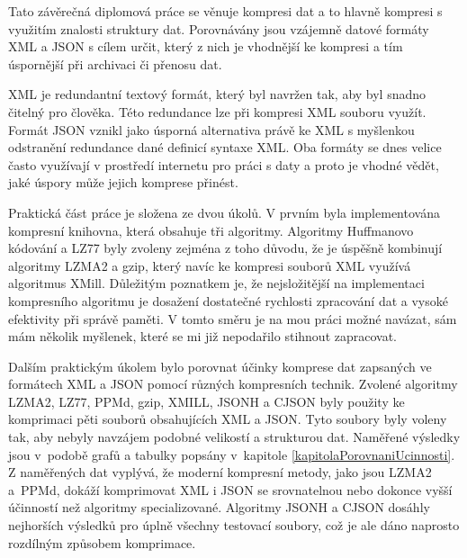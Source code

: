 

Tato závěrečná diplomová práce se věnuje kompresi dat a to hlavně kompresi s využitím znalosti struktury dat. Porovnávány jsou vzájemně datové formáty XML a JSON s cílem určit, který z nich je vhodnější ke kompresi a tím úspornější při archivaci či přenosu dat.

XML je redundantní textový formát, který byl navržen tak, aby byl snadno čitelný pro člověka. Této redundance lze při kompresi XML souboru využít. Formát JSON vznikl jako úsporná alternativa právě ke XML s myšlenkou odstranění redundance dané definicí syntaxe XML. Oba formáty se dnes velice často využívají v prostředí internetu pro práci s daty a proto je vhodné vědět, jaké úspory může jejich komprese přinést.

Praktická část práce je složena ze dvou úkolů. V prvním byla implementována kompresní knihovna, která obsahuje tři algoritmy. Algoritmy Huffmanovo kódování a LZ77 byly zvoleny zejména z toho důvodu, že je úspěšně kombinují algoritmy LZMA2 a gzip, který navíc ke kompresi souborů XML využívá algoritmus XMill. Důležitým poznatkem je, že nejsložitější na implementaci kompresního algoritmu je dosažení dostatečné rychlosti zpracování dat a vysoké efektivity při správě paměti. V tomto směru je na mou práci možné navázat, sám mám několik myšlenek, které se mi již nepodařilo stihnout zapracovat.

Dalším praktickým úkolem bylo porovnat účinky komprese dat zapsaných ve formátech XML a JSON pomocí různých kompresních technik. Zvolené algoritmy LZMA2, LZ77, PPMd, gzip, XMILL, JSONH a CJSON byly použity ke komprimaci pěti souborů obsahujících XML a JSON. Tyto soubory byly voleny tak, aby nebyly navzájem podobné velikostí a strukturou dat. Naměřené výsledky jsou v~podobě grafů a tabulky popsány v~kapitole \ref{kapitolaPorovnaniUcinnosti}. Z naměřených dat vyplývá, že moderní kompresní metody, jako jsou LZMA2 a~PPMd, dokáží komprimovat XML i JSON se srovnatelnou nebo dokonce vyšší účinností než algoritmy specializované. Algoritmy JSONH a CJSON dosáhly nejhorších výsledků pro úplně všechny testovací soubory, což je ale dáno naprosto rozdílným způsobem komprimace.

